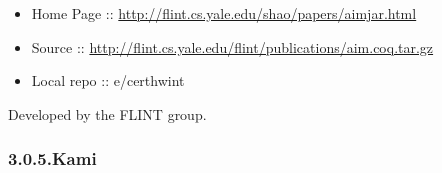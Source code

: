 \documentclass[12pt,twoside]{article}
\begin{document}
\begin{itemize}[noitemsep,topsep=\mdcompacttopsep]%

\item{}Home Page :: \href{http://flint.cs.yale.edu/shao/papers/aimjar.html}{{\ttfamily http://\hspace{0pt}flint.\hspace{0pt}cs.\hspace{0pt}yale.\hspace{0pt}edu/\hspace{0pt}shao/\hspace{0pt}papers/\hspace{0pt}aimjar.\hspace{0pt}html}}%

\item{}Source :: \href{http://flint.cs.yale.edu/flint/publications/aim.coq.tar.gz}{{\ttfamily http://\hspace{0pt}flint.\hspace{0pt}cs.\hspace{0pt}yale.\hspace{0pt}edu/\hspace{0pt}flint/\hspace{0pt}publications/\hspace{0pt}aim.\hspace{0pt}coq.\hspace{0pt}tar.\hspace{0pt}gz}}%

\item{}Local repo :: e/certhwint%
\end{itemize}%

\noindent{}Developed by the FLINT group.%

\subsubsection{3.0.5.\hspace*{0.5em}Kami}\label{sec-kami}%
\end{document}
